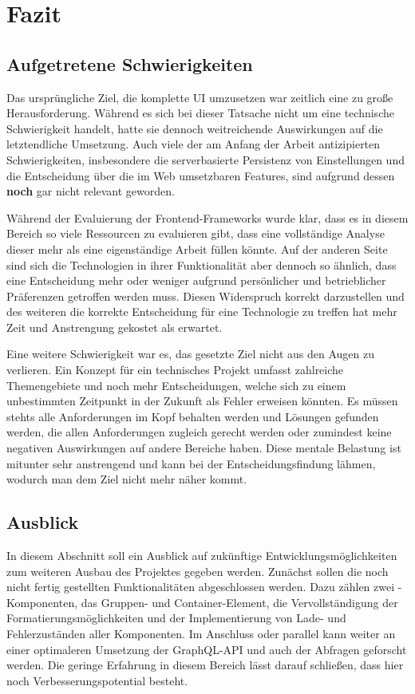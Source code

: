\chapter{Fazit}\label{chap:conclusion}

\section{Aufgetretene Schwierigkeiten}
Das ursprüngliche Ziel, die komplette UI umzusetzen war zeitlich eine zu große Herausforderung. Während es sich bei dieser Tatsache nicht um eine technische Schwierigkeit handelt, hatte sie dennoch weitreichende Auswirkungen auf die letztendliche Umsetzung. Auch viele der am Anfang der Arbeit antizipierten Schwierigkeiten, insbesondere die serverbasierte Persistenz von Einstellungen und die Entscheidung über die im Web umsetzbaren Features, sind aufgrund dessen \textbf{noch} gar nicht relevant geworden.

Während der Evaluierung der Frontend-Frameworks wurde klar, dass es in diesem Bereich so viele Ressourcen zu evaluieren gibt, dass eine vollständige Analyse dieser mehr als eine eigenständige Arbeit füllen könnte. Auf der anderen Seite sind sich die Technologien in ihrer Funktionalität aber dennoch so ähnlich, dass eine Entscheidung mehr oder weniger aufgrund persönlicher und betrieblicher Präferenzen getroffen werden muss. Diesen Widerspruch korrekt darzustellen und des weiteren die korrekte Entscheidung für eine Technologie zu treffen hat mehr Zeit und Anstrengung gekostet als erwartet.

Eine weitere Schwierigkeit war es, das gesetzte Ziel nicht aus den Augen zu verlieren. Ein Konzept für ein technisches Projekt umfasst zahlreiche Themengebiete und noch mehr Entscheidungen, welche sich zu einem unbestimmten Zeitpunkt in der Zukunft als Fehler erweisen könnten. Es müssen stehts alle Anforderungen im Kopf behalten werden und Lösungen gefunden werden, die allen Anforderungen zugleich gerecht werden oder zumindest keine negativen Auswirkungen auf andere Bereiche haben. Diese mentale Belastung ist mitunter sehr anstrengend und kann bei der Entscheidungsfindung lähmen, wodurch man dem Ziel nicht mehr näher kommt.

\section{Ausblick}
In diesem Abschnitt soll ein Ausblick auf zukünftige Entwicklungsmöglichkeiten zum weiteren Ausbau des Projektes gegeben werden. Zunächst sollen die noch nicht fertig gestellten Funktionalitäten abgeschlossen werden. Dazu zählen zwei -Komponenten, das Gruppen- und Container-Element, die Vervollständigung der Formatierungsmöglichkeiten und der Implementierung von Lade- und Fehlerzuständen aller Komponenten.
Im Anschluss oder parallel kann weiter an einer optimaleren Umsetzung der GraphQL-API und auch der Abfragen geforscht werden. Die geringe Erfahrung in diesem Bereich lässt darauf schließen, dass hier noch Verbesserungspotential besteht.

